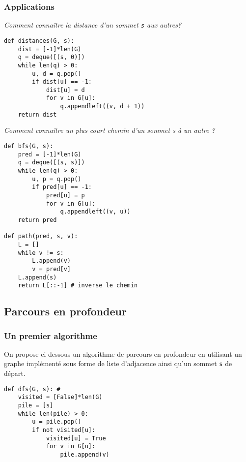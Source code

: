 \subsubsection{Applications}
\begin{exemple}
\textit{Comment connaître la distance d’un sommet \texttt{s} aux autres?}
\ifprof
\begin{lstlisting}
def distances(G, s):
    dist = [-1]*len(G)
    q = deque([(s, 0)])
    while len(q) > 0:
        u, d = q.pop()
        if dist[u] == -1:
            dist[u] = d
            for v in G[u]:
                q.appendleft((v, d + 1))
    return dist
\end{lstlisting}
\else
\vspace{5cm}
\fi
\end{exemple}

\begin{exemple}
\textit{Comment connaître un plus court chemin d’un sommet s à un autre ? }
\ifprof
\begin{lstlisting}
def bfs(G, s):
    pred = [-1]*len(G)
    q = deque([(s, s)])
    while len(q) > 0:
        u, p = q.pop()
        if pred[u] == -1:
            pred[u] = p
            for v in G[u]:
                q.appendleft((v, u))
    return pred
    
def path(pred, s, v):
    L = []
    while v != s:
        L.append(v)
        v = pred[v]
    L.append(s)
    return L[::-1] # inverse le chemin
\end{lstlisting}
\else
\vspace{10cm}
\fi
\end{exemple}


\subsection{Parcours en profondeur}
\subsubsection{Un premier algorithme}

On propose ci-dessous un algorithme de parcours en profondeur en utilisant un graphe implémenté sous forme de liste d'adjacence ainsi qu'un sommet \texttt{s} de départ. 

\begin{lstlisting}
def dfs(G, s): #
    visited = [False]*len(G)
    pile = [s]
    while len(pile) > 0:
        u = pile.pop()
        if not visited[u]:
            visited[u] = True
            for v in G[u]:
                pile.append(v)
\end{lstlisting}

